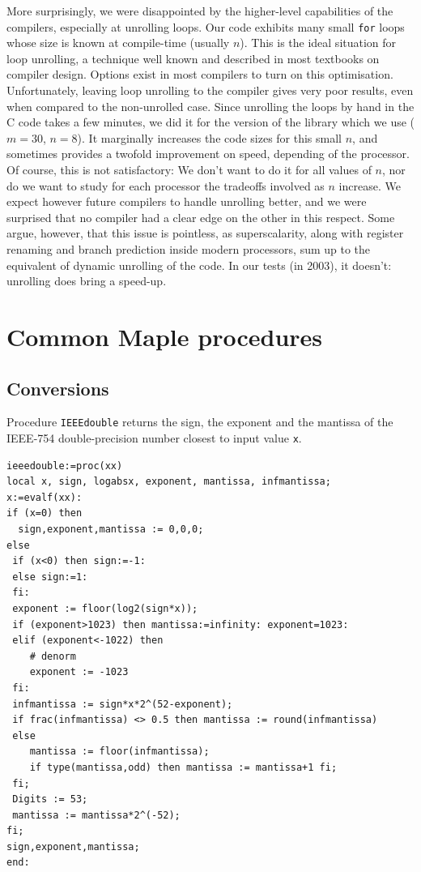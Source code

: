 More surprisingly, we were disappointed by the higher-level
capabilities of the compilers, especially at unrolling loops. Our code
exhibits many small \texttt{for} loops whose size is known at
compile-time (usually $n$). This is the ideal situation for loop
unrolling, a technique well known and described in most textbooks on
compiler design. Options exist in most compilers to turn on this
optimisation. Unfortunately, leaving loop unrolling to the compiler
gives very poor results, even when compared to the non-unrolled case.
Since unrolling the loops by hand in the C code takes a few minutes,
we did it for the version of the library which we use ($m=30$, $n=8$).
It marginally increases the code sizes for this small $n$, and
sometimes provides a twofold improvement on speed, depending of the
processor. Of course, this is not satisfactory: We don't want to do it
for all values of $n$, nor do we want to study for each processor the
tradeoffs involved as $n$ increase. We expect however future compilers
to handle unrolling better, and we were surprised that no compiler had
a clear edge on the other in this respect. Some argue, however, that
this issue is pointless, as superscalarity, along with register
renaming and branch prediction inside modern processors, sum up to the
equivalent of dynamic unrolling of the code. In our tests (in 2003), it
doesn't: unrolling does bring a speed-up.








\section{Common Maple procedures \label{section:commonMaple}}


\subsection{Conversions}


Procedure \texttt{IEEEdouble} returns the sign, the exponent and the
mantissa of the IEEE-754 double-precision number closest to input
value \texttt{x}.

\begin{lstlisting}[caption={nearest},firstnumber=1]
ieeedouble:=proc(xx) 
local x, sign, logabsx, exponent, mantissa, infmantissa; 
x:=evalf(xx):
if (x=0) then 
  sign,exponent,mantissa := 0,0,0; 
else 
 if (x<0) then sign:=-1:
 else sign:=1:
 fi:
 exponent := floor(log2(sign*x));
 if (exponent>1023) then mantissa:=infinity: exponent=1023:
 elif (exponent<-1022) then 
    # denorm
    exponent := -1023
 fi:
 infmantissa := sign*x*2^(52-exponent);
 if frac(infmantissa) <> 0.5 then mantissa := round(infmantissa)
 else
    mantissa := floor(infmantissa);
    if type(mantissa,odd) then mantissa := mantissa+1 fi;
 fi;
 Digits := 53;
 mantissa := mantissa*2^(-52);
fi;
sign,exponent,mantissa;
end:
\end{lstlisting}

